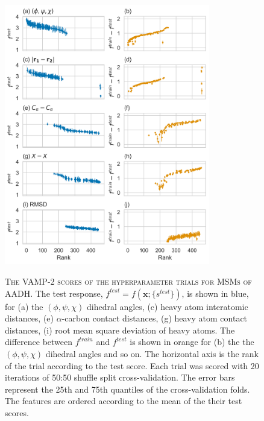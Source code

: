 \begin{figure}[p]
    \centering
    \caption[The VAMP-2 scores of the hyperparameter trials for MSMs of AADH]{\textsc{The VAMP-2 scores of the hyperparameter trials for MSMs of AADH}. The test response, $f^{test}=f\left(\mathbf{x}; \{s^{test}\}\right)$, is shown in blue, for (a) the $(\phi, \psi, \chi)$ dihedral angles, (c) heavy atom interatomic distances, (e) $\alpha$-carbon contact distances, (g) heavy atom contact distances, (i) root mean square deviation of heavy atoms. The difference between $f^{train}$ and $f^{test}$ is shown in orange for (b) the the $(\phi, \psi, \chi)$ dihedral angles and so on. The horizontal axis is the rank of the trial according to the test score. Each trial was scored with \num{20} iterations of 50:50 shuffle split cross-validation. The error bars represent the 25th and 75th quantiles of the cross-validation folds. The features are ordered according to the mean of the their test scores.}
    \includegraphics[width=0.8\textwidth]{chapters/msm_optimization/figures/aadh_train_test_results.png}
    \label{fig:aad_train_test}
\end{figure}

